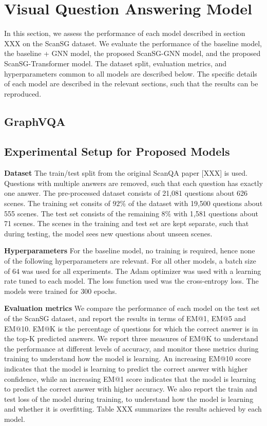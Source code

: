 \newpage
\section{Visual Question Answering Model}

In this section, we assess the performance of each model described in section XXX on the ScanSG dataset. We evaluate the performance of the baseline model, the baseline + GNN model, the proposed ScanSG-GNN model, and the proposed ScanSG-Transformer model. The dataset split, evaluation metrics, and hyperparameters common to all models are described below. The specific details of each model are described in the relevant sections, such that the results can be reproduced.

\subsection{GraphVQA}


\subsection{Experimental Setup for Proposed Models}
\bigskip
\noindent \textbf{Dataset}
The train/test split from the original ScanQA paper [XXX] is used. Questions with multiple answers are removed, such that each question has exactly one answer. The pre-processed dataset consists of 21,081 questions about 626 scenes. The training set consits of $92\%$ of the dataset with 19,500 questions about 555 scenes. The test set consists of the remaining $8\%$ with 1,581 questions about 71 scenes. The scenes in the training and test set are kept separate, such that during testing, the model sees new questions about unseen scenes.


\bigskip
\noindent \textbf{Hyperparameters}
For the baseline model, no training is required, hence none of the following hyperparameters are relevant. For all other models, a batch size of $64$ was used for all experiments. The Adam optimizer was used with a learning rate tuned to each model. The loss function used was the cross-entropy loss. The models were trained for $300$ epochs.

\bigskip
\noindent \textbf{Evaluation metrics}
We compare the performance of each model on the test set of the ScanSG dataset, and report the results in terms of EM@1, EM@5 and EM@10. EM@K is the percentage of questions for which the correct answer is in the top-K predicted answers. We report three measures of EM@K to understand the performance at different levels of accuracy, and monitor these metrics during training to understand how the model is learning. An increasing EM@10 score indicates that the model is learning to predict the correct answer with higher confidence, while an increasing EM@1 score indicates that the model is learning to predict the correct answer with higher accuracy.
We also report the train and test loss of the model during training, to understand how the model is learning and whether it is overfitting. Table XXX summarizes the results achieved by each model.

